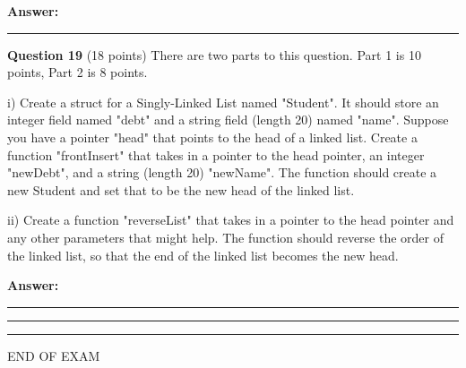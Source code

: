 \documentclass{exam}
\begin{document}
\textbf{Answer:}

\newpage




\begin{center}\noindent\rule{6in}{0.4pt}\end{center}

\textbf{Question 19} (18 points) There are two parts to this question. Part 1 is 10 points, Part 2 is 8 points.

i) Create a struct for a Singly-Linked List named "Student". It should store an integer field named "debt" and a string field (length 20) named "name". Suppose you have a pointer "head" that points to the head of a linked list. Create a function "frontInsert" that takes in a pointer to the head pointer, an integer "newDebt", and a string (length 20) "newName". The function should create a new Student and set that to be the new head of the linked list.

ii) Create a function "reverseList" that takes in a pointer to the head pointer and any other parameters that might help. The function should reverse the order of the linked list, so that the end of the linked list becomes the new head.

\textbf{Answer:}

\newpage

\begin{center}\noindent\rule{6in}{0.4pt}\end{center}

\newpage

\begin{center}\noindent\rule{6in}{0.4pt}\end{center}

\begin{center}\noindent\rule{6in}{0.4pt}\end{center}

\vspace{5px}

\begin{center} END OF EXAM \end{center}
\end{document}
